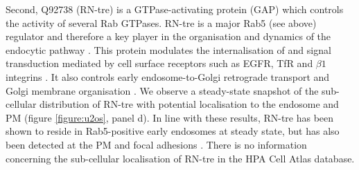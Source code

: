 \documentclass[12pt,english]{article}
\begin{document}
Second, Q92738 (RN-tre) is a GTPase-activating protein (GAP) which controls the activity of several Rab GTPases. RN-tre is a major Rab5 (see above) regulator and therefore a key player in the organisation and dynamics of the endocytic pathway \citep{Lanzetti::2000, Gautreau::2014}. This protein modulates the internalisation of and signal transduction mediated by cell surface receptors such as EGFR, TfR and $\beta 1$ integrins \citep{Lanzetti::2000, Martinu::2002, Palamidessi::2013, De::2015}. It also controls early endosome-to-Golgi retrograde transport and Golgi membrane organisation \citep{Haas::2007}. We observe a steady-state snapshot of the sub-cellular distribution of RN-tre with potential localisation to the endosome and PM (figure \ref{figure:u2os}, panel d). In line with these results, RN-tre has been shown to reside in Rab5-positive early endosomes at steady state, but has also been detected at the PM and focal adhesions \citep{Lanzetti::2000,Martinu::2002, Palamidessi::2013,Gautreau::2014, De::2015}. There is no information concerning the sub-cellular localisation of RN-tre in the HPA Cell Atlas database. 
\end{document}
